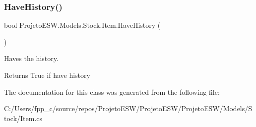 \subsubsection{\texorpdfstring{Have\+History()}{HaveHistory()}}
{\footnotesize\ttfamily bool Projeto\+E\+S\+W.\+Models.\+Stock.\+Item.\+Have\+History (\begin{DoxyParamCaption}{ }\end{DoxyParamCaption})}



Haves the history.

\begin{DoxyReturn}{Returns}
True if have history
\end{DoxyReturn}


The documentation for this class was generated from the following file\+:\begin{DoxyCompactItemize}
\item 
C\+:/\+Users/fpp\+\_\+c/source/repos/\+Projeto\+E\+S\+W/\+Projeto\+E\+S\+W/\+Projeto\+E\+S\+W/\+Models/\+Stock/Item.\+cs\end{DoxyCompactItemize}
